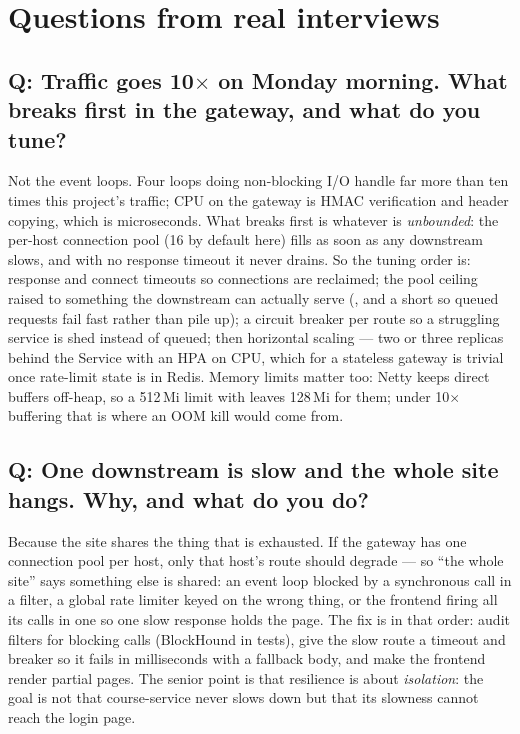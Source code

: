 \section{Questions from real interviews}

\subsection*{Q: Traffic goes 10$\times$ on Monday morning. What breaks first in the gateway, and what do you tune?}

Not the event loops. Four loops doing non-blocking I/O handle far more
than ten times this project's traffic; CPU on the gateway is HMAC
verification and header copying, which is microseconds. What breaks
first is whatever is \emph{unbounded}: the per-host connection pool (16
by default here) fills as soon as any downstream slows, and with no
response timeout it never drains. So the tuning order is: response and
connect timeouts so connections are reclaimed; the pool ceiling raised
to something the downstream can actually serve (,
and a short  so queued requests fail fast rather
than pile up); a circuit breaker per route so a struggling service is
shed instead of queued; then horizontal scaling --- two or three
replicas behind the Service with an HPA on CPU, which for a stateless
gateway is trivial once rate-limit state is in Redis. Memory limits
matter too: Netty keeps direct buffers off-heap, so a 512\,Mi limit
with  leaves 128\,Mi for them; under 10$\times$
buffering that is where an OOM kill would come from.

\subsection*{Q: One downstream is slow and the whole site hangs. Why, and what do you do?}

Because the site shares the thing that is exhausted. If the gateway has
one connection pool per host, only that host's route should degrade ---
so ``the whole site'' says something else is shared: an event loop
blocked by a synchronous call in a filter, a global rate limiter keyed
on the wrong thing, or the frontend firing all its calls in one
 so one slow response holds the page. The fix is in
that order: audit filters for blocking calls (BlockHound in tests),
give the slow route a timeout and breaker so it fails in milliseconds
with a fallback body, and make the frontend render partial pages. The
senior point is that resilience is about \emph{isolation}: the goal is
not that course-service never slows down but that its slowness cannot
reach the login page.

